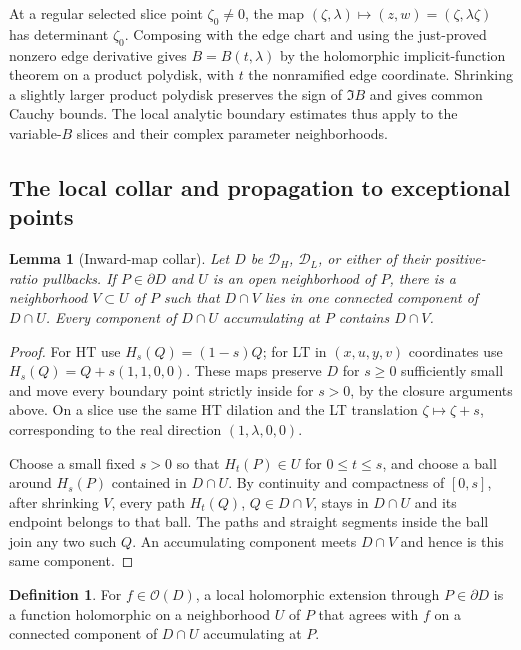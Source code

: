 \documentclass[11pt]{article}
\numberwithin{equation}{section}
\newtheorem{lemma}[theorem]{Lemma}
\theoremstyle{definition}
\newtheorem{definition}[theorem]{Definition}
\begin{document}
At a regular selected slice point $\zeta_0\ne0$, the map
$(\zeta,\lambda)\mapsto(z,w)=(\zeta,\lambda\zeta)$ has determinant
$\zeta_0$.  Composing with the edge chart and using the just-proved
nonzero edge derivative gives \(B=B(t,\lambda)\) by the holomorphic
implicit-function theorem on a product polydisk, with \(t\) the
nonramified edge coordinate. Shrinking a slightly larger product
polydisk preserves the sign of \(\Im B\) and gives common Cauchy
bounds. The local analytic boundary estimates thus apply to the
variable-\(B\) slices and their complex parameter neighborhoods.

\subsection{The local collar and propagation to exceptional points}
\begin{lemma}[Inward-map collar]\label{geo:collar}
Let $D$ be $\mathcal D_H$, $\mathcal D_L$, or either of their
positive-ratio pullbacks.  If $P\in\partial D$ and $U$ is an open
neighborhood of $P$, there is a neighborhood $V\subset U$ of $P$
such that $D\cap V$ lies in one connected component of $D\cap U$.
Every component of $D\cap U$ accumulating at $P$ contains $D\cap V$.
\end{lemma}
\begin{proof}
For HT use $H_s(Q)=(1-s)Q$; for LT in $(x,u,y,v)$ coordinates use
$H_s(Q)=Q+s(1,1,0,0)$.  These maps preserve $D$ for $s\ge0$
sufficiently small and move every boundary point strictly inside
for $s>0$, by the closure arguments above.  On a slice use the
same HT dilation and the LT translation $\zeta\mapsto\zeta+s$,
corresponding to the real direction $(1,\lambda,0,0)$.

Choose a small fixed $s>0$ so that $H_t(P)\in U$ for $0\le t\le s$,
and choose a ball around $H_s(P)$ contained in $D\cap U$.
By continuity and compactness of $[0,s]$, after shrinking $V$,
every path $H_t(Q)$, $Q\in D\cap V$, stays in $D\cap U$ and its
endpoint belongs to that ball.  The paths and straight segments
inside the ball join any two such $Q$.  An accumulating component
meets $D\cap V$ and hence is this same component.
\end{proof}

\begin{definition}\label{geo:componentwise-extension}
For $f\in\mathcal O(D)$, a local holomorphic extension through
$P\in\partial D$ is a function holomorphic on a neighborhood $U$
of $P$ that agrees with $f$ on a connected component of $D\cap U$
accumulating at $P$.
\end{definition}
\end{document}
